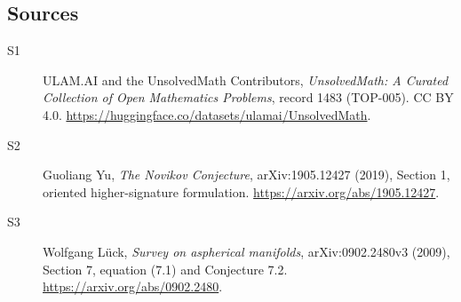 \documentclass[11pt]{article}
\begin{document}
\subsection{Sources}
\begin{description}
\item[\hypertarget{source:1483:1}{S1}] ULAM.AI and the UnsolvedMath Contributors, \emph{UnsolvedMath: A Curated Collection of Open Mathematics Problems}, record 1483 (TOP-005). CC BY 4.0. \url{https://huggingface.co/datasets/ulamai/UnsolvedMath}.
\item[\hypertarget{source:1483:2}{S2}] Guoliang Yu, \emph{The Novikov Conjecture}, arXiv:1905.12427 (2019), Section 1, oriented higher-signature formulation. \url{https://arxiv.org/abs/1905.12427}.
\item[\hypertarget{source:1483:3}{S3}] Wolfgang L\"uck, \emph{Survey on aspherical manifolds}, arXiv:0902.2480v3 (2009), Section 7, equation (7.1) and Conjecture 7.2. \url{https://arxiv.org/abs/0902.2480}.
\end{description}
\label{end:1483}
\end{document}
